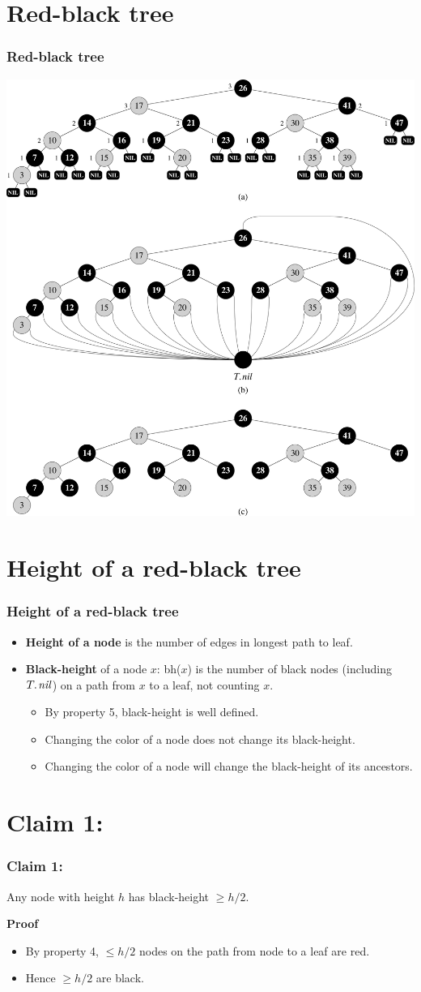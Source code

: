 \documentclass{beamer}
\newcommand{\bi}{\begin{itemize}}
\newcommand{\ii}{\item}
\newcommand{\ei}{\end{itemize}}
\newcommand{\sect}[1]{
\section{#1}
\begin{frame}[fragile]\frametitle{#1}
}
\begin{document}
\sect{Red-black tree}

\includegraphics[height=0.8\textheight]{Fig-13-1.pdf}

\end{frame}

\sect{Height of a red-black tree} \bi \ii \textbf{Height of a node} is
the number of edges in longest path to leaf.  \ii
\textbf{Black-height} of a node $x$: bh($x$) is the number of black
nodes (including $\attrib{T}{nil}$) on a path from $x$ to a leaf, not
counting $x$.  \bi \ii By property 5, black-height is well defined.
\ii Changing the color of a node does not change its black-height.
\ii Changing the color of a node will change the black-height of its
ancestors.  \ei

\ei

\end{frame}

\sect{Claim 1:} Any node with height $h$ has black-height $\geq h/2$.

\bigskip

  \textbf{Proof}
\bi\ii
  By property 4, $\leq h/2$ nodes on the path from node to a leaf are
  red.\ii  Hence $\geq h/2$ are black.\ei

\end{frame}
\end{document}
